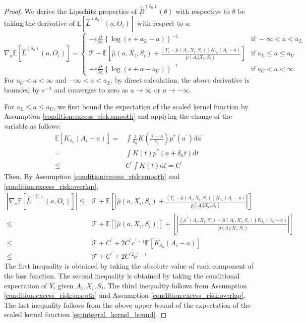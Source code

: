 \documentclass[12pt]{article}
\newcommand{\E}{\mathbb{E}}
\begin{document}
\begin{proof}
\noindent We derive the Lipschitz properties of $\widehat R^{({\delta_n})}(\theta)$ with respective to $\theta$ be taking the derivative of $\E\left[\widehat L^{({\delta_n})}(a,O_i)\right]$ with respect to $a$:
    \begin{equation*}
        \nabla_a\E\left[\widehat L^{({\delta_n})}(a,O_i)\right] = \begin{cases}
     -\epsilon \frac{\partial}{\partial a}\left\{\log( e + a_L- a)\right\}^{-1}& \text{if } -\infty<a<a_L\\
    \mathcal{T} - \E\left[\widehat\mu(a,X_i,S_i)+ \frac{(Y_i - \widehat\mu(A_i,X_i,S_i))K_{\delta_n}(A_i-a)}{\widehat p(A_{i}|X_{i},S_{i})}\right]&\text{if }  a_L\leq a\leq a_U\\
     -\epsilon \frac{\partial}{\partial a}\left\{\log( e + a- a_U)\right\}^{-1}&\text{if }  a_U<a< \infty
\end{cases}
    \end{equation*}
For $a_U<a< \infty$ and $-\infty<a<a_L$, by direct calculation, the above derivative is bounded by $e^{-1}$ and converges to zero as $a\rightarrow \infty$ or $a\rightarrow -\infty$. 

For $a_L\leq a\leq a_U$, we first bound the expectation of the scaled kernel function
by Assumption \ref{condition:excess_risk:smooth} and applying the change of the variable as follows:
\begin{align}
    \E\left[K_{\delta_n}(A_i-a)\right] = & \int \frac{1}{\delta_n} K\left(\frac{a^\prime -a}{\delta_n}\right) p^*(a^\prime)\mathrm{d}a^\prime\nonumber\\
    = & \int K\left(t\right) p^*(a+\delta_n t)\mathrm{d}t\nonumber\\
    \leq & C^\prime\int K\left(t\right)\mathrm{d}t = C^\prime\label{eq:integral_kernel_bound}
\end{align}    
Then, By Assumption \ref{condition:excess_risk:smooth} and \ref{condition:excess_risk:overlap},
\begin{align*}
\left|\nabla_a\E\left[\widehat L^{({\delta_n})}(a,O_i)\right]\right|\leq &\mathcal{T}+\E\left[\left|\widehat\mu(a,X_i,S_i)+ \frac{(Y_i - \widehat\mu(A_i,X_i,S_i))K_{\delta_n}(A_i-a)}{\widehat p(A_{i}|X_{i},S_{i})}\right|\right]\\
\leq &\mathcal{T}+\E\left[\left|\widehat\mu(a,X_i,S_i)\right|\right]+\left[\left|\frac{(\mu^*(A_i,X_i,S_i) - \widehat\mu(A_i,X_i,S_i))K_{\delta_n}(A_i-a)}{\widehat p(A_{i}|X_{i},S_{i})}\right|\right]\\
    \leq & \mathcal{T}+C^\prime + 2C^\prime c^{\prime-1}\E\left[K_{\delta_n}(A_i-a)\right]\\
    \leq & \mathcal{T}+C^\prime + 2C^{\prime2}c^{\prime-1}
\end{align*}
The first inequality is obtained by taking the absolute value of each component of the loss function. The second inequality is obtained by taking the conditional expectation of $Y_i$ given $A_i,X_i,S_i$. The third inequality follows from Assumption \ref{condition:excess_risk:smooth} and Assumption \ref{condition:excess_risk:overlap}. The last inequality follows from the above upper bound of the expectation of the scaled kernel function \eqref{eq:integral_kernel_bound}. 


\end{proof}
\end{document}
